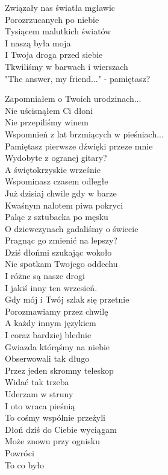 
\begin{text}
    Związały nas światła mgławic\\
    Porozrzucanych po niebie\\
    Tysiącem malutkich światów\\
    I naszą była moja\\
    I Twoja droga przed siebie\\
    Tkwiliśmy w barwach i wierszach\\
    "The answer, my friend..." - pamiętasz?

    Zapomniałem o Twoich urodzinach...\\
    Nie uścisnąłem Ci dłoni\\
    Nie przepiliśmy winem\\
    Wspomnień z lat brzmiących w pieśniach...\\
    Pamiętasz pierwsze dźwięki przeze mnie\\
    Wydobyte z ogranej gitary?\\
    A świętokrzyskie wrześnie\\
    Wspominasz czasem odległe\\
    Już dzisiaj chwile gdy w barze\\
    Kwaśnym nalotem piwa pokryci\\
    Paląc z sztubacka po męsku\\
    O dziewczynach gadaliśmy o świecie\\
    Pragnąc go zmienić na lepszy?\\
    Dziś dłońmi szukając wokoło\\
    Nie spotkam Twojego oddechu\\
    I różne są nasze drogi\\
    I jakiś inny ten wrzesień.\\
    Gdy mój i Twój szlak się przetnie\\
    Porozmawiamy przez chwilę\\
    A każdy innym językiem\\
    I coraz bardziej blednie\\
    Gwiazda którąśmy na niebie\\
    Obserwowali tak długo\\
    Przez jeden skromny teleskop\\
    Widać tak trzeba\\
    Uderzam w struny\\
    I oto wraca pieśnią\\
    To cośmy wspólnie przeżyli\\
    Dłoń dziś do Ciebie wyciągam\\
    Może znowu przy ognisku\\
    Powróci\\
    To co było
\end{text}
\begin{chord}

\end{chord}